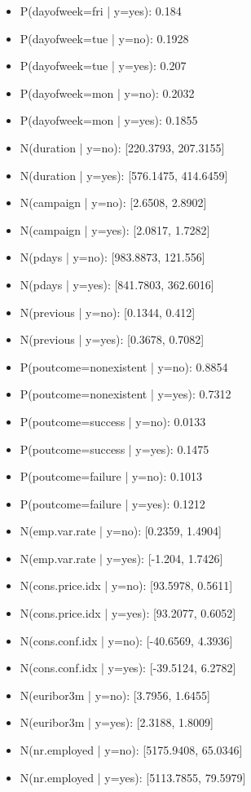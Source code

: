 \documentclass[letterpaper, 10 pt, conference]{ieeeconf}
\begin{document}
\begin{itemize}
	\item P(dayofweek=fri | y=yes): 0.184
	\item P(dayofweek=tue | y=no): 0.1928
	\item P(dayofweek=tue | y=yes): 0.207
	\item P(dayofweek=mon | y=no): 0.2032
	\item P(dayofweek=mon | y=yes): 0.1855
	\item N(duration | y=no): [220.3793, 207.3155]
	\item N(duration | y=yes): [576.1475, 414.6459]
	\item N(campaign | y=no): [2.6508, 2.8902]
	\item N(campaign | y=yes): [2.0817, 1.7282]
	\item N(pdays | y=no): [983.8873, 121.556]
	\item N(pdays | y=yes): [841.7803, 362.6016]
	\item N(previous | y=no): [0.1344, 0.412]
	\item N(previous | y=yes): [0.3678, 0.7082]
	\item P(poutcome=nonexistent | y=no): 0.8854
	\item P(poutcome=nonexistent | y=yes): 0.7312
	\item P(poutcome=success | y=no): 0.0133
	\item P(poutcome=success | y=yes): 0.1475
	\item P(poutcome=failure | y=no): 0.1013
	\item P(poutcome=failure | y=yes): 0.1212
	\item N(emp.var.rate | y=no): [0.2359, 1.4904]
	\item N(emp.var.rate | y=yes): [-1.204, 1.7426]
	\item N(cons.price.idx | y=no): [93.5978, 0.5611]
	\item N(cons.price.idx | y=yes): [93.2077, 0.6052]
	\item N(cons.conf.idx | y=no): [-40.6569, 4.3936]
	\item N(cons.conf.idx | y=yes): [-39.5124, 6.2782]
	\item N(euribor3m | y=no): [3.7956, 1.6455]
	\item N(euribor3m | y=yes): [2.3188, 1.8009]
	\item N(nr.employed | y=no): [5175.9408, 65.0346]
	\item N(nr.employed | y=yes): [5113.7855, 79.5979]
\end{itemize}

\newpage
\end{document}
